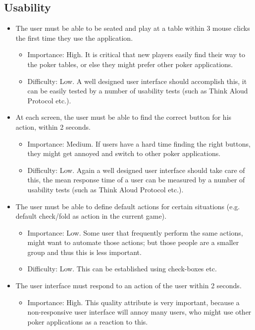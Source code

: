 \documentclass[a4paper,11pt]{report}
\begin{document}
\subsection{Usability}
\begin{itemize}
\item The user must be able to be seated and play at a table within 3 mouse clicks the first time they use
the application.
\begin{itemize}
\item Importance: High. It is critical that new players easily find their way to the poker tables, or else
they might prefer other poker applications.
\item Difficulty: Low. A well designed user interface should accomplish this, it can be easily tested by
a number of usability tests (such as Think Aloud Protocol etc.).
\end{itemize}
\item At each screen, the user must be able to find the correct button for his action, within 2 seconds.
\begin{itemize}
\item Importance: Medium. If users have a hard time finding the right buttons, they might get annoyed and 
switch to other poker applications.
\item Difficulty: Low. Again a well designed user interface should take care of this, the mean response
time of a user can be measured by a number of usability tests (such as Think Aloud Protocol etc.).
\end{itemize}
\item The user must be able to define default actions for certain situations (e.g. default check/fold as action
in the current game).
\begin{itemize}
\item Importance: Low. Some user that frequently perform the same actions, might want to automate those actions;
but those people are a smaller group and thus this is less important.
\item Difficulty: Low. This can be established using check-boxes etc.
\end{itemize}
\item The user interface must respond to an action of the user within 2 seconds.
\begin{itemize}
\item Importance: High. This quality attribute is very important, because a non-responsive user interface
will annoy many users, who might use other poker applications as a reaction to this.

\end{itemize}
\end{itemize}
\end{document}
